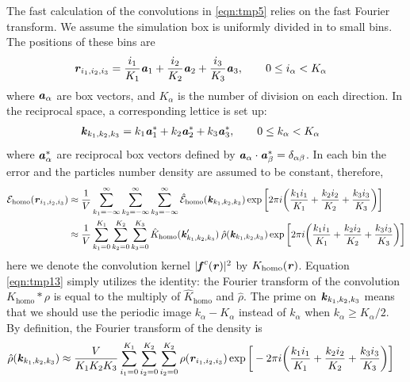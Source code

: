 \documentclass[aps,pre,preprint]{revtex4}
\renewcommand{\v}[1]{\textbf{\textit{#1}}}
\begin{document}
The fast calculation of the convolutions in \eqref{eqn:tmp5} relies on
the fast Fourier transform. We assume the simulation box is uniformly
divided in to small bins.  The positions of these bins are
\begin{align}
  \v r_{i_1, i_2, i_3} & =
  \frac{i_1}{K_1}\v a_1 + 
  \frac{i_2}{K_2}\v a_2 + 
  \frac{i_3}{K_3}\v a_3,\qquad 0\leq i_\alpha< K_\alpha
\end{align}
where $\v a_\alpha$ are box vectors, and $K_\alpha$ is the number of
division on each direction. In the reciprocal space, a corresponding
lettice is set up:
\begin{align}
  \v k_{k_1, k_2, k_3} & =
  k_1\v a_1^\ast +
  k_2\v a_2^\ast +
  k_3\v a_3^\ast, \qquad 0\leq k_\alpha<K_\alpha
\end{align}
where $\v a_\alpha^\ast$ are reciprocal box vectors defined by $\v
a_\alpha\cdot\v a_\beta^\ast = \delta_{\alpha\beta}$.  In each bin the
error and the particles number density are assumed to be constant,
therefore,
\begin{align}\nonumber
  \mathcal E_{\textrm{homo}}(\v r_{i_1,i_2,i_3})
  & \approx
  \frac1V\sum_{k_1=-\infty}^\infty\sum_{k_2=-\infty}^\infty\sum_{k_3=-\infty}^\infty
  \hat{\mathcal E}_{\textrm{homo}}(\v k_{k_1,k_2,k_3})
  \exp\bigg[
  2\pi i\bigg(
  \frac{k_1i_1}{K_1} + \frac{k_2i_2}{K_2} + \frac{k_3i_3}{K_3}
  \bigg)
  \bigg] \\\label{eqn:tmp13}
  & \approx
  \frac1V\sum_{k_1=0}^{K_1}\sum_{k_2=0}^{K_2}\sum_{k_3=0}^{K_3}
  \hat{K}_{\textrm{homo}}(\v k'_{k_1,k_2,k_3})\:
  \hat{\rho}(\v k_{k_1,k_2,k_3})
  \exp\bigg[
  2\pi i\bigg(
  \frac{k_1i_1}{K_1} + \frac{k_2i_2}{K_2} + \frac{k_3i_3}{K_3}
  \bigg)
  \bigg]   
\end{align}
here we denote the convolution kernel $\vert\v f^c(\v r)\vert^2$ by
$K_{\textrm{homo}}(\v r)$.  Equation \eqref{eqn:tmp13} simply utilizes
the identity: the Fourier transform of the convolution
$K_{\textrm{homo}}\ast\rho$ is equal to the multiply of
$\hat{K}_{\textrm{homo}}$ and $\hat\rho$.  The prime on $\v
k_{k_1,k_2,k_3}$ means that we should use the periodic image $k_\alpha
- K_\alpha$ instead of $k_\alpha$ when $k_\alpha \geq K_\alpha/2$. By
definition, the Fourier transform of the density is
\begin{align}
  \hat\rho(\v k_{k_1,k_2,k_3})
  & \approx
  \frac{V}{K_1K_2K_3}
  \sum_{i_1=0}^{K_1}\sum_{i_2=0}^{K_2}\sum_{i_2=0}^{K_2}
  \rho(\v r_{i_1,i_2,i_3})
  \exp\bigg[
  -2\pi i\bigg(
  \frac{k_1i_1}{K_1} + \frac{k_2i_2}{K_2} + \frac{k_3i_3}{K_3}
  \bigg)
  \bigg]
\end{align}
\end{document}
